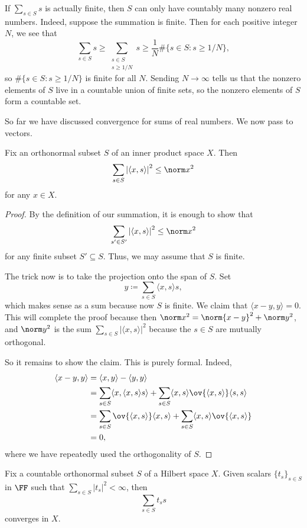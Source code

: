 \documentclass[../notes.tex]{subfiles}
\begin{document}
\begin{remark}
	If $\sum_{s\in S}s$ is actually finite, then $S$ can only have countably many nonzero real numbers. Indeed, suppose the summation is finite. Then for each positive integer $N$, we see that
	\[\sum_{s\in S}s\ge\sum_{\substack{s\in S\\s\ge1/N}}s\ge\frac1N\#\{s\in S:s\ge1/N\},\]
	so $\#\{s\in S:s\ge1/N\}$ is finite for all $N$. Sending $N\to\infty$ tells us that the nonzero elements of $S$ live in a countable union of finite sets, so the nonzero elements of $S$ form a countable set.
\end{remark}
So far we have discussed convergence for sums of real numbers. We now pass to vectors.
\begin{proposition}
	Fix an orthonormal subset $S$ of an inner product space $X$. Then
	\[\sum_{s\in S}\left|\langle x,s\rangle\right|^2\le\norm x^2\]
	for any $x\in X$.
\end{proposition}
\begin{proof}
	By the definition of our summation, it is enough to show that
	\[\sum_{s'\in S'}\left|\langle x,s\rangle\right|^2\le\norm x^2\]
	for any finite subset $S'\subseteq S$. Thus, we may assume that $S$ is finite.

	The trick now is to take the projection onto the span of $S$. Set
	\[y\coloneqq\sum_{s\in S}\langle x,s\rangle s,\]
	which makes sense as a sum because now $S$ is finite. We claim that $\langle x-y,y\rangle=0$. This will complete the proof because then $\norm x^2=\norm{x-y}^2+\norm y^2$, and $\norm y^2$ is the sum $\sum_{s\in S}\left|\langle x,s\rangle\right|^2$ because the $s\in S$ are mutually orthogonal.

	So it remains to show the claim. This is purely formal. Indeed,
	\begin{align*}
		\langle x-y,y\rangle &= \langle x,y\rangle-\langle y,y\rangle \\
		&= \sum_{s\in S}\langle x,\langle x,s\rangle s\rangle+\sum_{s\in S}\langle x,s\rangle\ov{\langle x,s\rangle}\langle s,s\rangle \\
		&= \sum_{s\in S}\ov{\langle x,s\rangle}\langle x, s\rangle+\sum_{s\in S}\langle x,s\rangle\ov{\langle x,s\rangle} \\
		&= 0,
	\end{align*}
	where we have repeatedly used the orthogonality of $S$.
\end{proof}
\begin{lemma}
	Fix a countable orthonormal subset $S$ of a Hilbert space $X$. Given scalars $\{t_s\}_{s\in S}$ in $\FF$ such that $\sum_{s\in S}\left|t_s\right|^2<\infty$, then
	\[\sum_{s\in S}t_ss\]
	converges in $X$.
\end{lemma}
\end{document}
